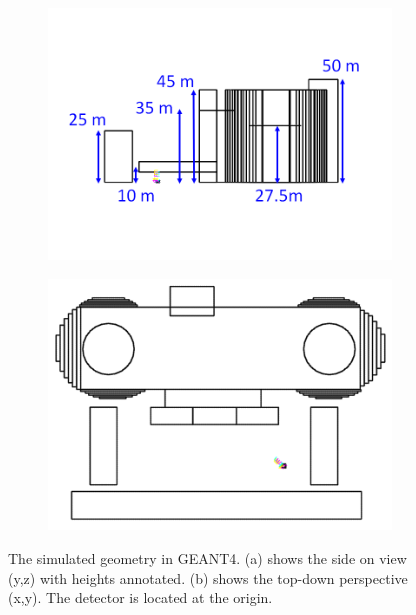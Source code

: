 \begin{figure}[!h]
\centering
\begin{subfigure}{.5\textwidth}
  \centering
  \includegraphics[width=\linewidth]{Chapter5/Figs/wylfaRasterNew/WylfaSimGeomSideOn.png}
  \captionsetup{width=.9\linewidth}
  \caption{}
  \label{subFig:WylfaSimGeomSideOn}
\end{subfigure}%
\begin{subfigure}{.5\textwidth}
  \centering
\includegraphics[width=\linewidth]{Chapter5/Figs/wylfaRasterNew/WylfaSimGeomTopDown.png}
  \captionsetup{width=.9\linewidth}
  \caption{}
  \label{subFig:WylfaSimGeomTopDown}
\end{subfigure}
\caption{The simulated geometry in GEANT4. (a) shows the side on view (y,z) with heights annotated. (b) shows the top-down perspective (x,y). The detector is located at the origin.}
\label{fig:WylfaSimGeom_SideOn_TopDown}
\end{figure}

